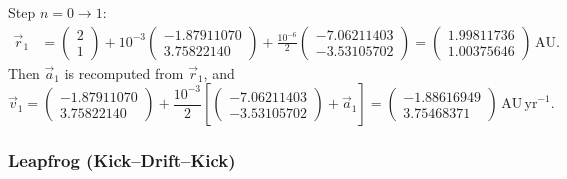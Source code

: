 Step $n = 0 \to 1$:
\begin{align*}
    \vec{r}_1 &= \begin{pmatrix}2\\1\end{pmatrix}
    + 10^{-3}\begin{pmatrix}-1.87911070\\3.75822140\end{pmatrix}
    + \frac{10^{-6}}{2}\begin{pmatrix}-7.06211403\\-3.53105702\end{pmatrix}
    = \begin{pmatrix}1.99811736\\1.00375646\end{pmatrix}\,\mathrm{AU}.
\end{align*}
Then $\vec{a}_1$ is recomputed from $\vec{r}_1$, and
\begin{equation*}
    \vec{v}_1 = \begin{pmatrix}-1.87911070\\3.75822140\end{pmatrix}
    + \frac{10^{-3}}{2}
    \left[\begin{pmatrix}-7.06211403\\-3.53105702\end{pmatrix}
        + \vec{a}_1\right]
    = \begin{pmatrix}-1.88616949\\3.75468371\end{pmatrix}\,\mathrm{AU\,yr}^{-1}.
\end{equation*}

\subsubsection*{Leapfrog (Kick--Drift--Kick)}

